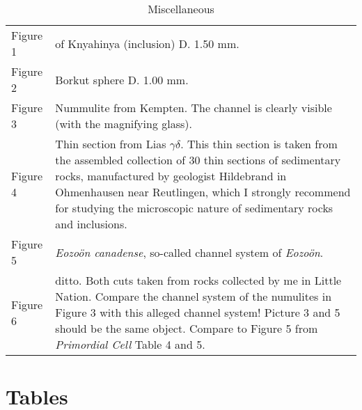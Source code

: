 \documentclass[a4paper, 12pt, oneside]{article}
\begin{document}
\begin{table}[ht!]
\caption{Miscellaneous}
\centering
\begin{tabular}{ p{2cm} p{10cm} }
\hline
 Figure 1 & of Knyahinya (inclusion) D. 1.50 mm. \\
 Figure 2 & Borkut sphere D. 1.00 mm. \\
 Figure 3 & Nummulite from Kempten. The channel is clearly visible (with the magnifying glass). \\
 Figure 4 & Thin section from Lias $\gamma\delta$. This thin section is taken from the assembled collection of 30 thin sections of sedimentary rocks, manufactured by geologist Hildebrand in Ohmenhausen near Reutlingen, which I strongly recommend for studying the microscopic nature of sedimentary rocks and inclusions. \\
 Figure 5 & \emph{Eozoön canadense}, so-called channel system of \emph{Eozoön}. \\
 Figure 6 & ditto. Both cuts taken from rocks collected by me in Little Nation. Compare the channel system of the numulites in Figure 3 with this alleged channel system! Picture 3 and 5 should be the same object. Compare to Figure 5 from \emph{Primordial Cell} Table 4 and 5. \\
\end{tabular}
\label{table:32}
\end{table}
\clearpage
\section{Tables}
\end{document}

